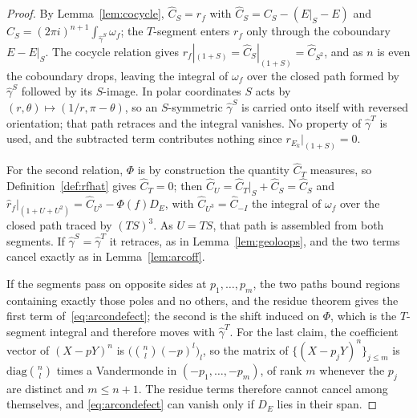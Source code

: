 \documentclass[11pt]{article}
\begin{document}
\begin{proof}
By Lemma~\ref{lem:cocycle}, $\hat C_S=r_f$ with $\hat C_S=C_S-(E|_S-E)$ and
$C_S=(2\pi i)^{n+1}\int_{\hat\gamma^S}\omega_f$; the $T$-segment enters $r_f$ only through the
coboundary $E-E|_S$. The cocycle relation gives $r_f|_{(1+S)}=\hat C_S|_{(1+S)}=\hat C_{S^2}$, and
as $n$ is even the coboundary drops, leaving the integral of $\omega_f$ over the closed path formed
by $\hat\gamma^S$ followed by its $S$-image. In polar coordinates $S$ acts by
$(r,\theta)\mapsto(1/r,\pi-\theta)$, so an $S$-symmetric $\hat\gamma^S$ is carried onto itself with
reversed orientation; that path retraces and the integral vanishes. No property of $\hat\gamma^T$ is
used, and the subtracted term contributes nothing since $r_{E_k}|_{(1+S)}=0$.

For the second relation, $\Phi$ is by construction the quantity $\hat C_T$ measures, so
Definition~\ref{def:rfhat} gives $\hat C_T=0$; then $\hat C_U=\hat C_T|_S+\hat C_S=\hat C_S$ and
$\hat r_f|_{(1+U+U^2)}=\hat C_{U^3}-\Phi(f)D_E$, with $\hat C_{U^3}=\hat C_{-I}$ the integral of
$\omega_f$ over the closed path traced by $(TS)^3$. As $U=TS$, that path is assembled from both
segments. If $\hat\gamma^S=\hat\gamma^T$ it retraces, as in Lemma~\ref{lem:geoloops}, and the two
terms cancel exactly as in Lemma~\ref{lem:arcoff}.

If the segments pass on opposite sides at $p_1,\dots,p_m$, the two paths bound regions containing
exactly those poles and no others, and the residue theorem gives the first term
of~\eqref{eq:arcondefect}; the second is the shift induced on $\Phi$, which is the $T$-segment
integral and therefore moves with $\hat\gamma^T$. For the last claim, the coefficient vector of
$(X-pY)^n$ is $\big(\binom{n}{l}(-p)^{l}\big)_{l}$, so the matrix of $\{(X-p_jY)^n\}_{j\le m}$ is
$\mathrm{diag}\binom{n}{l}$ times a Vandermonde in $(-p_1,\dots,-p_m)$, of rank $m$ whenever the
$p_j$ are distinct and $m\le n+1$. The residue terms therefore cannot cancel among themselves, and
\eqref{eq:arcondefect} can vanish only if $D_E$ lies in their span.
\end{proof}

\end{document}
